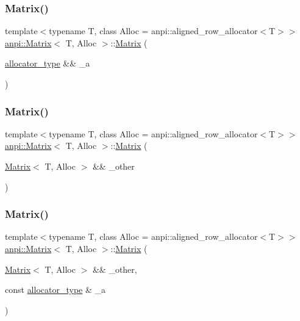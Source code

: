\subsubsection{\texorpdfstring{Matrix()}{Matrix()}\hspace{0.1cm}{\footnotesize\ttfamily [13/17]}}
{\footnotesize\ttfamily template$<$typename T, class Alloc = anpi\+::aligned\+\_\+row\+\_\+allocator$<$\+T$>$$>$ \\
\hyperlink{classanpi_1_1Matrix}{anpi\+::\+Matrix}$<$ T, Alloc $>$\+::\hyperlink{classanpi_1_1Matrix}{Matrix} (\begin{DoxyParamCaption}\item[{\hyperlink{classanpi_1_1Matrix_a3574b7528e3ddfb2f7cdf446be8286c1}{allocator\+\_\+type} \&\&}]{\+\_\+a }\end{DoxyParamCaption})\hspace{0.3cm}{\ttfamily [noexcept]}}

\mbox{\label{classanpi_1_1Matrix_a70dbc1b133b92274770ba28090136dea}} 
\subsubsection{\texorpdfstring{Matrix()}{Matrix()}\hspace{0.1cm}{\footnotesize\ttfamily [14/17]}}
{\footnotesize\ttfamily template$<$typename T, class Alloc = anpi\+::aligned\+\_\+row\+\_\+allocator$<$\+T$>$$>$ \\
\hyperlink{classanpi_1_1Matrix}{anpi\+::\+Matrix}$<$ T, Alloc $>$\+::\hyperlink{classanpi_1_1Matrix}{Matrix} (\begin{DoxyParamCaption}\item[{\hyperlink{classanpi_1_1Matrix}{Matrix}$<$ T, Alloc $>$ \&\&}]{\+\_\+other }\end{DoxyParamCaption})}

\mbox{\label{classanpi_1_1Matrix_acfb5fd6cd5be0c9d1b6f1915b1ac5f64}} 
\subsubsection{\texorpdfstring{Matrix()}{Matrix()}\hspace{0.1cm}{\footnotesize\ttfamily [15/17]}}
{\footnotesize\ttfamily template$<$typename T, class Alloc = anpi\+::aligned\+\_\+row\+\_\+allocator$<$\+T$>$$>$ \\
\hyperlink{classanpi_1_1Matrix}{anpi\+::\+Matrix}$<$ T, Alloc $>$\+::\hyperlink{classanpi_1_1Matrix}{Matrix} (\begin{DoxyParamCaption}\item[{\hyperlink{classanpi_1_1Matrix}{Matrix}$<$ T, Alloc $>$ \&\&}]{\+\_\+other,  }\item[{const \hyperlink{classanpi_1_1Matrix_a3574b7528e3ddfb2f7cdf446be8286c1}{allocator\+\_\+type} \&}]{\+\_\+a }\end{DoxyParamCaption})}

